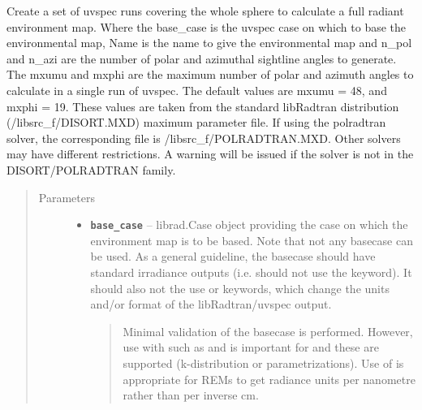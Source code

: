 \documentclass[a4paper,10pt,english]{sphinxmanual}
\begin{document}
\begin{fulllineitems}
\begin{quote}
\begin{description}
\begin{itemize}
\end{itemize}

\end{description}\end{quote}

\begin{fulllineitems}
\label{packages:librad.HyperRadEnv.__init__}
Create a set of uvspec runs covering the whole sphere to calculate a full radiant environment map.
Where the base\_case is the uvspec case on which to base the environmental map, Name is the name to give the
environmental map and n\_pol and n\_azi are the number of polar and azimuthal sightline angles to generate. The
mxumu and mxphi are the maximum number of polar and azimuth angles to calculate in a single run of uvspec.
The default values are mxumu = 48, and mxphi = 19. These values are taken from the standard libRadtran
distribution (/libsrc\_f/DISORT.MXD) maximum parameter file. If using the polradtran solver, the corresponding
file is /libsrc\_f/POLRADTRAN.MXD. Other solvers may have different restrictions. A warning will be issued if
the solver is not in the DISORT/POLRADTRAN family.
\begin{quote}\begin{description}
\item[{Parameters}] \leavevmode\begin{itemize}
\item {} 
\textbf{\texttt{base\_case}} -- 
librad.Case object providing the case on which the environment map is to be based. Note
that not any basecase can be used. As a general guideline, the basecase should have standard irradiance
outputs (i.e. should not use the  keyword). It should also not the use  or
 keywords, which change the units and/or format of the libRadtran/uvspec output.
\begin{quote}

Minimal validation of the basecase is performed. However, use with  such as  and
 is important for  and these are supported (k-distribution or 
parametrizations). Use of  is appropriate for  REMs to get
radiance units per nanometre rather than per inverse cm.
\end{quote}



\end{itemize}
\end{description}
\end{quote}
\end{fulllineitems}
\end{fulllineitems}
\end{document}
